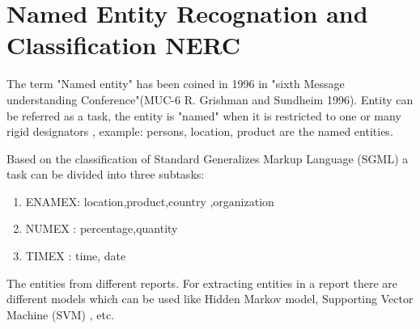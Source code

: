 \section{ Named Entity Recognation and Classification  NERC}

The term "Named entity" has been coined in 1996 in "sixth  Message understanding Conference"(MUC-6  R. Grishman and  Sundheim 1996).
Entity can be referred as a task, the entity is "named" when it is restricted to one or many rigid designators \citep{sharnagat2014named}, example: persons, location, product are the named entities.

Based on the classification of Standard Generalizes Markup Language (SGML) a task can be divided into three subtasks:
\begin{enumerate}
\item ENAMEX: location,product,country ,organization
\item NUMEX : percentage,quantity 
\item TIMEX : time, date
\end{enumerate}


The entities from different reports.
For extracting entities in a report there are different models which can be used like Hidden Markov model, Supporting Vector Machine (SVM) ,
etc.

